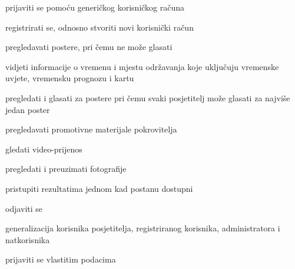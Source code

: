 			\begin{packed_enum}
				\item  {}
				
				\begin{packed_enum}
					
					\item prijaviti se pomoću generičkog korisničkog računa
					
				\end{packed_enum}
				
				\item  {}
				
				\begin{packed_enum}
					
					\item registrirati se, odnosno stvoriti novi korisnički račun
					\item pregledavati postere, pri čemu ne može glasati
					\item vidjeti informacije o vremenu i mjestu održavanja koje uključuju vremenske uvjete, vremensku prognozu i kartu
					
				\end{packed_enum}
			
				\item  {}
				
				\begin{packed_enum}
					
					\item pregledati i glasati za postere pri čemu svaki posjetitelj može glasati za najviše jedan poster
					\item pregledavati promotivne materijale pokrovitelja
					\item gledati video-prijenos
					\item pregledati i preuzimati fotografije
					\item pristupiti rezultatima jednom kad postanu dostupni
					\item odjaviti se
				
				\end{packed_enum}
				
				\item  {}
				
				\begin{packed_enum}
					
					\item generalizacija korisnika posjetitelja, registriranog korisnika, administratora i natkorisnika
					\item prijaviti se vlastitim podacima
					

\end{packed_enum}
\end{packed_enum}
